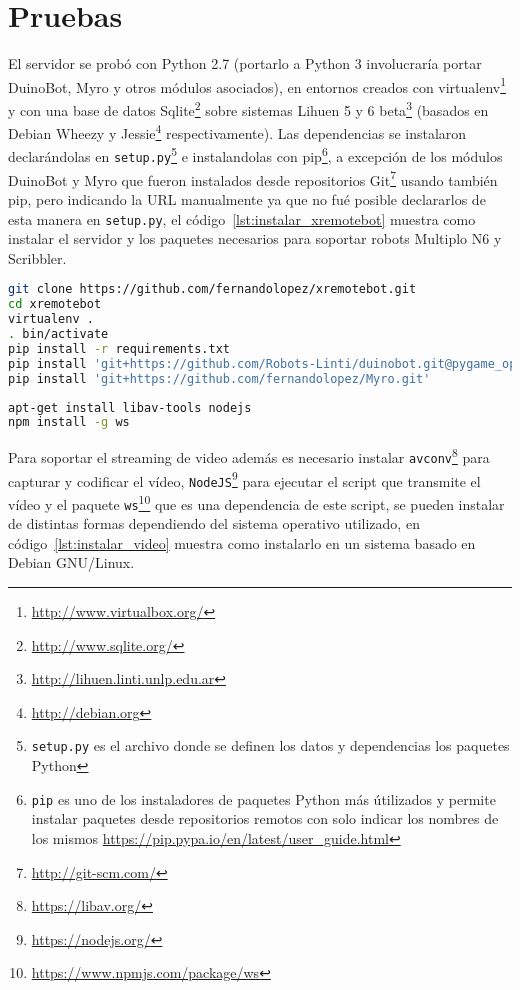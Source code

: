 \chapter{Pruebas}\label{cha:pruebas}

El servidor se probó con Python 2.7 (portarlo a Python 3 involucraría
portar DuinoBot, Myro y otros módulos asociados), en entornos creados
con virtualenv\footnote{\url{http://www.virtualbox.org/}}
y con una base de datos
Sqlite\footnote{\url{http://www.sqlite.org/}}
sobre
sistemas Lihuen 5 y 6 beta\footnote{\url{http://lihuen.linti.unlp.edu.ar}}
(basados en Debian Wheezy y Jessie\footnote{\url{http://debian.org}}
respectivamente).
Las dependencias se instalaron declarándolas en
\texttt{setup.py}\footnote{\texttt{setup.py} es el archivo donde se definen los
datos y dependencias los paquetes Python}
e instalandolas
con pip\footnote{\texttt{pip} es uno de los instaladores de paquetes Python
más útilizados y permite instalar paquetes desde repositorios remotos
con solo indicar los nombres de los mismos
\url{https://pip.pypa.io/en/latest/user_guide.html}},
a excepción de los módulos DuinoBot y Myro que fueron instalados
desde repositorios Git\footnote{\url{http://git-scm.com/}}
usando también pip, pero indicando la URL manualmente
ya que no fué posible declararlos de esta manera en \texttt{setup.py}, el
código~\ref{lst:instalar_xremotebot} muestra como instalar el servidor
y los paquetes necesarios para soportar robots Multiplo N6 y Scribbler.

\begin{lstlisting}[language=bash,
caption={Instalación de XRemoteBot},
label=lst:instalar_xremotebot]
git clone https://github.com/fernandolopez/xremotebot.git
cd xremotebot
virtualenv .
. bin/activate
pip install -r requirements.txt
pip install 'git+https://github.com/Robots-Linti/duinobot.git@pygame_opcional'
pip install 'git+https://github.com/fernandolopez/Myro.git'
\end{lstlisting}

\begin{lstlisting}[language=bash,
caption={Instalación del soporte de video para XRemoteBot},
label=lst:instalar_video]
apt-get install libav-tools nodejs
npm install -g ws
\end{lstlisting}

Para soportar el streaming de video además es necesario instalar
\texttt{avconv}\footnote{\url{https://libav.org/}} para capturar
y codificar el vídeo,
\texttt{NodeJS}\footnote{\url{https://nodejs.org/}} para ejecutar
el script que transmite el vídeo
y el paquete
\texttt{ws}\footnote{\url{https://www.npmjs.com/package/ws}}
que es una dependencia de este script,
se pueden instalar de distintas formas dependiendo del sistema operativo
utilizado, en código~\ref{lst:instalar_video} muestra como instalarlo
en un sistema basado en Debian GNU/Linux.


